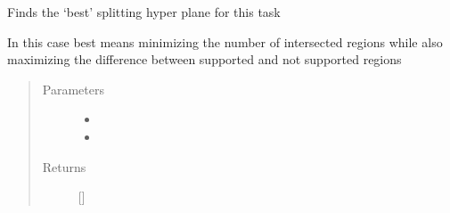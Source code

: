 \documentclass[letterpaper,10pt,english]{sphinxmanual}
\begin{document}
\begin{fulllineitems}
\label{\detokenize{ppopt.upop:ppopt.upop.ucontroller.determine_hyperplane}}
\sphinxAtStartPar
Finds the ‘best’ splitting hyper plane for this task

\sphinxAtStartPar
In this case best means minimizing the number of intersected regions while also maximizing the difference between supported and not supported regions
\begin{quote}\begin{description}
\item[{Parameters}] \leavevmode\begin{itemize}
\item {} 
\sphinxAtStartPar
{} \textendash{} 

\item {} 
\sphinxAtStartPar
{} \textendash{} 

\end{itemize}

\item[{Returns}] \leavevmode
\sphinxAtStartPar
{[}{]}

\end{description}\end{quote}

\end{fulllineitems}

\end{document}
